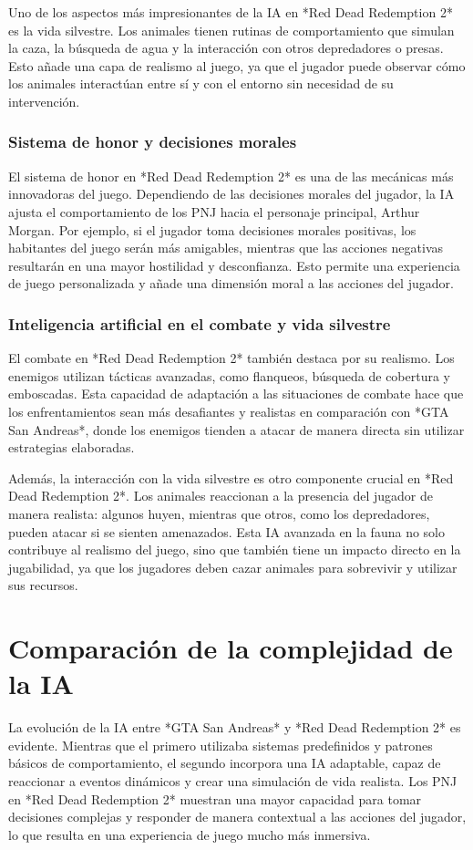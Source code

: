 \documentclass[10pt]{article}
\begin{document}
Uno de los aspectos más impresionantes de la IA en *Red Dead Redemption 2* es la vida silvestre. Los animales tienen rutinas de comportamiento que simulan la caza, la búsqueda de agua y la interacción con otros depredadores o presas. Esto añade una capa de realismo al juego, ya que el jugador puede observar cómo los animales interactúan entre sí y con el entorno sin necesidad de su intervención.

\subsubsection{Sistema de honor y decisiones morales}
El sistema de honor en *Red Dead Redemption 2* es una de las mecánicas más innovadoras del juego. Dependiendo de las decisiones morales del jugador, la IA ajusta el comportamiento de los PNJ hacia el personaje principal, Arthur Morgan. Por ejemplo, si el jugador toma decisiones morales positivas, los habitantes del juego serán más amigables, mientras que las acciones negativas resultarán en una mayor hostilidad y desconfianza. Esto permite una experiencia de juego personalizada y añade una dimensión moral a las acciones del jugador.

\subsubsection{Inteligencia artificial en el combate y vida silvestre}
El combate en *Red Dead Redemption 2* también destaca por su realismo. Los enemigos utilizan tácticas avanzadas, como flanqueos, búsqueda de cobertura y emboscadas. Esta capacidad de adaptación a las situaciones de combate hace que los enfrentamientos sean más desafiantes y realistas en comparación con *GTA San Andreas*, donde los enemigos tienden a atacar de manera directa sin utilizar estrategias elaboradas.

Además, la interacción con la vida silvestre es otro componente crucial en *Red Dead Redemption 2*. Los animales reaccionan a la presencia del jugador de manera realista: algunos huyen, mientras que otros, como los depredadores, pueden atacar si se sienten amenazados. Esta IA avanzada en la fauna no solo contribuye al realismo del juego, sino que también tiene un impacto directo en la jugabilidad, ya que los jugadores deben cazar animales para sobrevivir y utilizar sus recursos.

\section{Comparación de la complejidad de la IA}
La evolución de la IA entre *GTA San Andreas* y *Red Dead Redemption 2* es evidente. Mientras que el primero utilizaba sistemas predefinidos y patrones básicos de comportamiento, el segundo incorpora una IA adaptable, capaz de reaccionar a eventos dinámicos y crear una simulación de vida realista. Los PNJ en *Red Dead Redemption 2* muestran una mayor capacidad para tomar decisiones complejas y responder de manera contextual a las acciones del jugador, lo que resulta en una experiencia de juego mucho más inmersiva.
\end{document}
